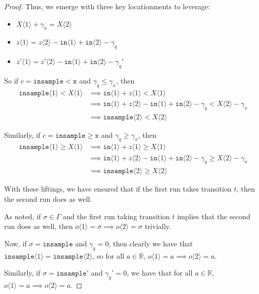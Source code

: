 \documentclass[12pt]{article}
\newcommand{\RR}{\mathbb{R}}
\newcommand{\gguard}[1][x]{\texttt{insample}\geq#1}
\newcommand{\lguard}[1][x]{\texttt{insample} < #1}
\newcommand{\brangle}[1]{\langle#1 \rangle}
\theoremstyle{definition}
\begin{document}
\begin{proof}
Thus, we emerge with three key locationments to leverage:\begin{itemize}
    \item $X\brangle{1} + \gamma_x = X\brangle{2}$
    \item $z\brangle{1} = z\brangle{2} - \texttt{in}\brangle{1}+\texttt{in}\brangle{2}-\gamma_q$
    \item $z'\brangle{1} = z'\brangle{2} - \texttt{in}\brangle{1}+\texttt{in}\brangle{2}-\gamma_q'$
\end{itemize}

So if $c=\lguard[\texttt{x}]$ and $\gamma_q\leq \gamma_x$, then \begin{align*}
    \texttt{insample}\brangle{1}<X\brangle{1}&\implies \texttt{in}\brangle{1}+z\brangle{1}<X\brangle{1}\\
    &\implies \texttt{in}\brangle{1}+z\brangle{2}-\texttt{in}\brangle{1}+\texttt{in}\brangle{2}-\gamma_q<X\brangle{2}-\gamma_x\\
    &\implies \texttt{insample}\brangle{2}<X\brangle{2}
\end{align*}

Similarly, if $c=\gguard[\texttt{x}]$ and $\gamma_q\geq \gamma_x$, then \begin{align*}
    \texttt{insample}\brangle{1}\geq X\brangle{1}&\implies \texttt{in}\brangle{1}+z\brangle{1}\geq X\brangle{1}\\
    &\implies \texttt{in}\brangle{1}+z\brangle{2}-\texttt{in}\brangle{1}+\texttt{in}\brangle{2}-\gamma_q\geq X\brangle{2}-\gamma_x\\
    &\implies \texttt{insample}\brangle{2}\geq X\brangle{2}
\end{align*}

With these liftings, we have ensured that if the first run takes transition $t$, then the second run does as well. 

As noted, if $\sigma \in \Gamma$ and the first run taking transition $t$ implies that the second run does as well, then $o\brangle{1} = \sigma \implies o\brangle{2}=\sigma$ trivially.

Now, if $\sigma=\texttt{insample}$ and $\gamma_q=0$, then clearly we have that $\texttt{insample}\brangle{1}=\texttt{insample}\brangle{2}$, so for all $a\in \RR$, $o\brangle{1} = a\implies o\brangle{2} = a$.

Similarly, if $\sigma=\texttt{insample}'$ and $\gamma_q'=0$, we have that for all $a\in \RR$, $o\brangle{1} = a\implies o\brangle{2} = a$.


\end{proof}
\end{document}
